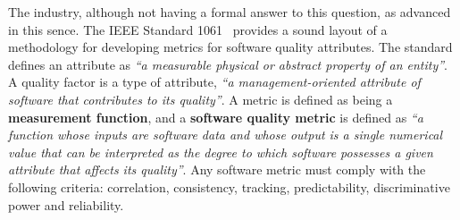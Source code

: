 \par The industry, although not having a formal answer to this question, as advanced in this sence. The IEEE Standard 1061~\cite{g1:Ieee1061:1998} provides a sound layout of a methodology for developing metrics for software quality attributes. The standard defines an attribute as \emph{``a measurable physical or abstract property of an entity''}. A quality factor is a type of attribute,
\emph{``a management-oriented attribute of software that contributes to its quality''}. A metric is defined as being a {\bf measurement function}, and a {\bf software quality metric} is defined as \emph{``a function whose inputs are software data and whose output is a single numerical value that can be interpreted as the degree to which software possesses a given attribute that affects its quality''}. Any software metric must comply with the following criteria: correlation, consistency, tracking, predictability, discriminative power and reliability.


